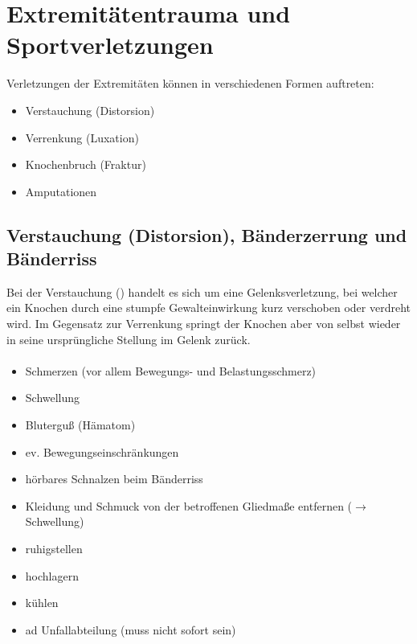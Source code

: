 
\section{Extremitätentrauma und Sportverletzungen}
Verletzungen der Extremitäten können in verschiedenen Formen auftreten:
\begin{itemize}
  \item Verstauchung (Distorsion)
  \item Verrenkung (Luxation)
  \item Knochenbruch (Fraktur)
  \item Amputationen
\end{itemize}

\subsection{Verstauchung (Distorsion), Bänderzerrung und Bänderriss}

Bei der Verstauchung () handelt es sich um eine Gelenksverletzung,
bei welcher ein Knochen durch eine stumpfe Gewalteinwirkung kurz verschoben oder
verdreht wird. Im Gegensatz zur Verrenkung springt der Knochen aber von selbst
wieder in seine ursprüngliche Stellung im Gelenk zurück.

\paragraph{\TxSymptome}
\begin{itemize}
  \item Schmerzen (vor allem Bewegungs- und Belastungsschmerz)
  \item Schwellung
  \item Bluterguß (Hämatom)
  \item ev. Bewegungseinschränkungen
  \item hörbares Schnalzen beim Bänderriss
\end{itemize}

{
\begin{itemize}
  \item Kleidung und Schmuck von der betroffenen Gliedmaße entfernen
  ($\rightarrow$ Schwellung)
  \item ruhigstellen
  \item hochlagern
  \item kühlen
  \item ad Unfallabteilung (muss nicht sofort sein)
\end{itemize}
}






